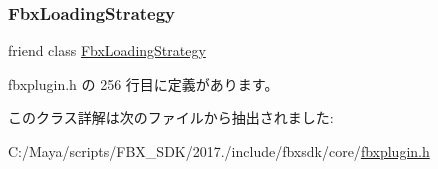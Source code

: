 \subsubsection{\texorpdfstring{Fbx\+Loading\+Strategy}{FbxLoadingStrategy}}
{\footnotesize\ttfamily friend class \hyperlink{class_fbx_loading_strategy}{Fbx\+Loading\+Strategy}\hspace{0.3cm}{\ttfamily [friend]}}



 fbxplugin.\+h の 256 行目に定義があります。



このクラス詳解は次のファイルから抽出されました\+:\begin{DoxyCompactItemize}
\item 
C\+:/\+Maya/scripts/\+F\+B\+X\+\_\+\+S\+D\+K/2017./include/fbxsdk/core/\hyperlink{fbxplugin_8h}{fbxplugin.\+h}\end{DoxyCompactItemize}

